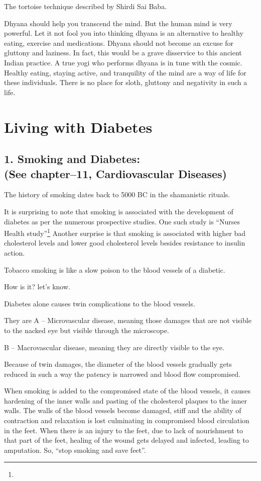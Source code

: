  \item 
 The tortoise technique described by Shirdi Sai Baba.

 Dhyana should help you transcend the mind. But the human mind is very powerful. Let it not fool you into thinking dhyana is an alternative to healthy eating, exercise and medications. Dhyana should not become an excuse for gluttony and laziness. In fact, this would be a grave disservice to this ancient Indian practice. A true yogi who performs dhyana is in tune with the cosmic. Healthy eating, staying active, and tranquility of the mind are a way of life for these individuals. There is no place for sloth, gluttony and negativity in such a life.



\chapter{Living with Diabetes}\label{chap28}

\section{1. Smoking and Diabetes:\\ (See chapter–11, Cardiovascular Diseases)}

The history of smoking dates back to 5000 BC in the shamanistic rituals.

It is surprising to note that smoking is associated with the development of diabetes as per the numerous prospective studies. One such study is “Nurses Health study”\footnote{} Another surprise is that smoking is associated with higher bad cholesterol levels and lower good cholesterol levels besides resistance to insulin action.

Tobacco smoking is like a slow poison to the blood vessels of a diabetic.

How is it? let’s know.

Diabetes alone causes twin complications to the blood vessels.

They are A – Microvascular disease, meaning those damages that are not visible to the nacked eye but visible through the microscope.

B – Macrovascular disease, meaning they are directly visible to the eye.

Because of twin damages, the diameter of the blood vessels gradually gets reduced in such a way the patency is narrowed and blood flow compromised.

When smoking is added to the compromised state of the blood vessels, it causes hardening of the inner walls and pasting of the cholesterol plaques to the inner walls. The walls of the blood vessels become damaged, stiff and the ability of contraction and relaxation is lost culminating in compromised blood circulation in the feet. When there is an injury to the feet, due to lack of nourishment to that part of the feet, healing of the wound gets delayed and infected, leading to amputation. So, “stop smoking and save feet”.

